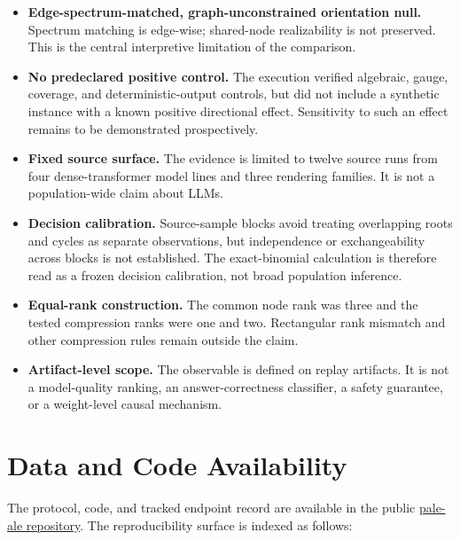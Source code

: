 \documentclass[11pt]{article}
\begin{document}
\begin{itemize}
    \item \textbf{Edge-spectrum-matched, graph-unconstrained orientation null.} Spectrum matching is edge-wise;
    shared-node realizability is not preserved. This is the central
    interpretive limitation of the comparison.
    \item \textbf{No predeclared positive control.} The execution verified
    algebraic, gauge, coverage, and deterministic-output controls, but did not
    include a synthetic instance with a known positive directional effect.
    Sensitivity to such an effect remains to be demonstrated prospectively.
    \item \textbf{Fixed source surface.} The evidence is limited to twelve
    source runs from four dense-transformer model lines and three rendering
    families. It is not a population-wide claim about LLMs.
    \item \textbf{Decision calibration.} Source-sample blocks avoid treating
    overlapping roots and cycles as separate observations, but independence or
    exchangeability across blocks is not established. The exact-binomial
    calculation is therefore read as a frozen decision calibration, not broad
    population inference.
    \item \textbf{Equal-rank construction.} The common node rank was three and
    the tested compression ranks were one and two. Rectangular rank mismatch
    and other compression rules remain outside the claim.
    \item \textbf{Artifact-level scope.} The observable is defined on replay
    artifacts. It is not a model-quality ranking, an answer-correctness
    classifier, a safety guarantee, or a weight-level causal mechanism.
\end{itemize}

\section{Data and Code Availability}
\label{sec:availability}

The protocol, code, and tracked endpoint record are available in the public
\href{https://github.com/Udonburo/pale-ale}{pale-ale repository}. The
reproducibility surface is indexed as follows:
\end{document}
